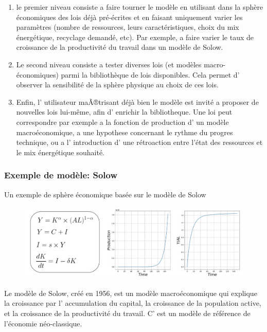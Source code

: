 \documentclass[12pt,a4paper]{article}%
\begin{document}
\begin{enumerate}
\item le premier niveau consiste a faire tourner le modèle en utilisant
dans la sphère économiques des lois déjà pré-écrites et en faisant
uniquement varier les paramètres (nombre de ressources, leurs
caractéristiques, choix du mix énergétique, recyclage demandé, etc). Par
exemple, a faire varier le taux de croissance de la productivité du travail
dans un modèle de Solow.

\item Le second niveau consiste a tester diverses lois (et modèles
macro-économiques) parmi la bibliothèque de lois disponibles. Cela permet
d' observer la sensibilité de la sphère physique au choix de ces lois.

\item Enfin, l' utilisateur maÃ®trisant déjà bien le modèle est invité
a proposer de nouvelles lois lui-même, afin d' enrichir la bibliotheque. Une
loi peut correspondre par exemple a la fonction de production d' un modèle
macroéconomique, a une hypothese concernant le rythme du progres technique, ou
a l' introduction d' une rétroaction entre l'état des ressources et le mix
énergétique souhaité.
\end{enumerate}

\subsubsection{{Exemple de modèle: Solow}}

{Un exemple de sphère économique basée sur le modèle de Solow}

\begin{figure}[h]
\centering \includegraphics[width=1.0\textwidth]{figures/solow2.jpg}\end{figure}

Le modèle de Solow, créé en 1956, est un modèle macroéconomique qui
explique la croissance par l' accumulation du capital, la croissance de la
population active, et la croissance de la productivité du travail. C' est un
modèle de référence de l'économie néo-classique.
\end{document}
